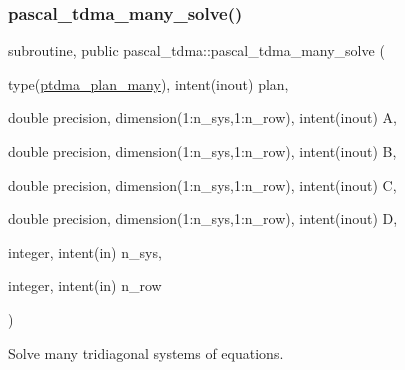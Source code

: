 \subsubsection{\texorpdfstring{pascal\+\_\+tdma\+\_\+many\+\_\+solve()}{pascal\_tdma\_many\_solve()}}
{\footnotesize\ttfamily subroutine, public pascal\+\_\+tdma\+::pascal\+\_\+tdma\+\_\+many\+\_\+solve (\begin{DoxyParamCaption}\item[{type(\hyperlink{structpascal__tdma_1_1ptdma__plan__many}{ptdma\+\_\+plan\+\_\+many}), intent(inout)}]{plan,  }\item[{double precision, dimension(1\+:n\+\_\+sys,1\+:n\+\_\+row), intent(inout)}]{A,  }\item[{double precision, dimension(1\+:n\+\_\+sys,1\+:n\+\_\+row), intent(inout)}]{B,  }\item[{double precision, dimension(1\+:n\+\_\+sys,1\+:n\+\_\+row), intent(inout)}]{C,  }\item[{double precision, dimension(1\+:n\+\_\+sys,1\+:n\+\_\+row), intent(inout)}]{D,  }\item[{integer, intent(in)}]{n\+\_\+sys,  }\item[{integer, intent(in)}]{n\+\_\+row }\end{DoxyParamCaption})}



Solve many tridiagonal systems of equations. 


